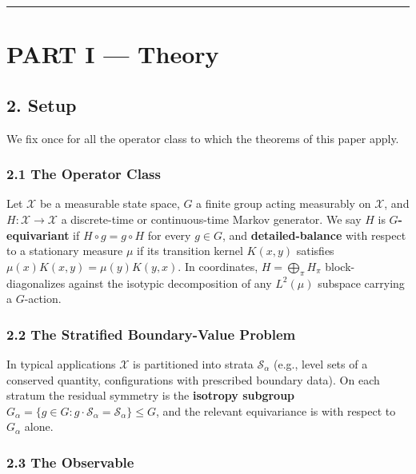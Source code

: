 \documentclass[
  11pt,
]{article}
\begin{document}
\begin{center}\rule{0.5\linewidth}{0.5pt}\end{center}

\section{PART I --- Theory}\label{part-i-theory}

\subsection{2. Setup}\label{setup}

We fix once for all the operator class to which the theorems of this
paper apply.

\subsubsection{2.1 The Operator Class}\label{the-operator-class}

Let \(\mathcal{X}\) be a measurable state space, \(G\) a finite group
acting measurably on \(\mathcal{X}\), and
\(H : \mathcal{X} \to \mathcal{X}\) a discrete-time or continuous-time
Markov generator. We say \(H\) is \textbf{\(G\)-equivariant} if
\(H \circ g = g \circ H\) for every \(g \in G\), and
\textbf{detailed-balance} with respect to a stationary measure \(\mu\)
if its transition kernel \(K(x, y)\) satisfies
\(\mu(x) K(x, y) = \mu(y) K(y, x)\). In coordinates,
\(H = \bigoplus_\pi H_\pi\) block-diagonalizes against the isotypic
decomposition of any \(L^2(\mu)\) subspace carrying a \(G\)-action.

\subsubsection{2.2 The Stratified Boundary-Value
Problem}\label{the-stratified-boundary-value-problem}

In typical applications \(\mathcal{X}\) is partitioned into strata
\(\mathcal{S}_\alpha\) (e.g., level sets of a conserved quantity,
configurations with prescribed boundary data). On each stratum the
residual symmetry is the \textbf{isotropy subgroup}
\(G_\alpha = \{g \in G : g \cdot \mathcal{S}_\alpha = \mathcal{S}_\alpha\} \leq G\),
and the relevant equivariance is with respect to \(G_\alpha\) alone.

\subsubsection{2.3 The Observable}\label{the-observable}
\end{document}

